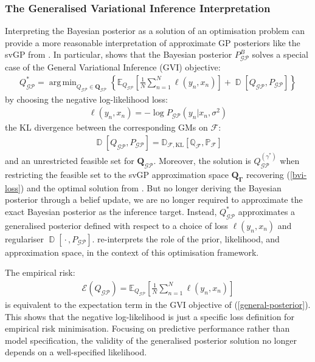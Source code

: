 \documentclass{article}
\newcommand{\D}{\operatorname{\mathbb{D}}}
\newcommand{\GP}{\operatorname{\mathcal{GP}}}
\newcommand{\wc}{\operatorname{{}\cdot{}}}
\DeclareMathOperator*{\argmin}{arg\,min}
\numberwithin{equation}{section}
\begin{document}
\subsubsection{The Generalised Variational Inference Interpretation}
Interpreting the Bayesian posterior as a solution of an optimisation problem can provide a more reasonable interpretation of approximate GP posteriors like the svGP from \cite{titsias2009variational}. In particular, \cite{knoblauch2022optimization} shows that the Bayesian posterior $P_{\GP}^B$ solves a special case of the General Variational Inference (GVI) objective:
\begin{align}
Q_{\GP}^* = \argmin_{Q_{\GP} \in \boldsymbol{Q}_{\GP}} \left\{ \mathbb{E}_{Q_{\GP}}\left[\frac{1}{N}\sum_{n=1}^N \ell(y_n, x_n)\right] + \D\left[Q_{\GP}, P_{\GP}\right]\right\}
\label{general-posterior}
\end{align}
by choosing the negative log-likelihood loss:
\begin{align}
    \ell(y_n, x_n) = -\log P_{\GP}\left(y_n \vert x_n, \sigma^2\right)
\end{align}
the KL divergence between the corresponding GMs on $\mathcal{F}$:
\begin{align}
    \D \left[Q_{\GP}, P_{\GP}\right] = \mathbb{D}_{\mathcal{F}, \text{KL}}\left[\mathbb{Q}_{\mathcal{F}}, \mathbb{P}_{\mathcal{F}}\right]
\end{align}
and an unrestricted feasible set for $\boldsymbol{Q}_{\GP}$. Moreover, the solution is $Q_{\GP}^{(\gamma^*)}$ when restricting the feasible set to the svGP approximation space $\boldsymbol{Q}_{\boldsymbol{\Gamma}}$ recovering (\ref{bvi-loss}) and the optimal solution from \cite{titsias2009variational}. But no longer deriving the Bayesian posterior through a belief update, we are no longer required to approximate the exact Bayesian posterior as the inference target. Instead, $Q_{\GP}^*$ approximates a generalised posterior defined with respect to a choice of loss $\ell(y_n, x_n)$ and regulariser $\D\left[\wc, P_{\GP}\right]$. \cite{knoblauch2022optimization} re-interprets the role of the prior, likelihood, and approximation space, in the context of this optimisation framework.

The empirical risk: 
\begin{align}
\mathcal{E}(Q_{\GP}) = \mathbb{E}_{Q_{\GP}}\left[\frac{1}{N}\sum_{n=1}^N \ell\left(y_n, x_n\right)\right]
\label{empirical-risk}
\end{align}
is equivalent to the expectation term in the GVI objective of (\ref{general-posterior}). This shows that the negative log-likelihood is just a specific loss definition for empirical risk minimisation. Focusing on predictive performance rather than model specification, the validity of the generalised posterior solution no longer depends on a well-specified likelihood.
\end{document}
